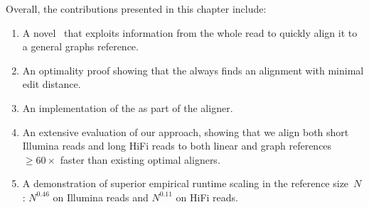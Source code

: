 Overall, the contributions presented in this chapter include:
\begin{enumerate}
    \item A novel \A~\sh that exploits information from the whole read to
    quickly align it to a general graphs reference.
    \item An optimality proof showing that the \sh always finds an alignment
    with minimal edit distance.
	\item An implementation of the \sh as part of the \astarix aligner.
    \item An extensive evaluation of our approach, showing that we align both
    short Illumina reads and long HiFi reads to both linear and graph references
    $\geq 60 \times$ faster than existing optimal aligners.
    \item A demonstration of superior empirical runtime scaling in the reference
    size~$N$: $N^{0.46}$ on Illumina reads and $N^{0.11}$ on HiFi reads.
\end{enumerate}


